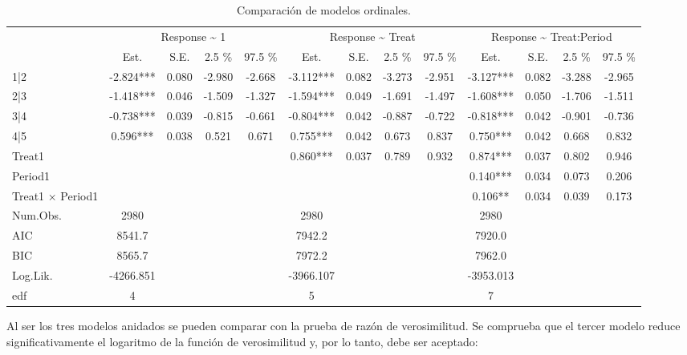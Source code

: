 \documentclass[
  12pt,
  a4paper,
  extrafontsizes,
  onecolumn,
  openright,
  table]{memoir}
\begin{document}
\hypertarget{tbl-ordinal-com}{}
\begin{longtable}{lcccccccccccc}
\caption{\label{tbl-ordinal-com}Comparación de modelos ordinales. }\tabularnewline

\toprule
 & \multicolumn{4}{c}{Response \textasciitilde{} 1    } & \multicolumn{4}{c}{Response \textasciitilde{} Treat    } & \multicolumn{4}{c}{Response \textasciitilde{} Treat:Period    } \\ 
\cmidrule(lr){2-5} \cmidrule(lr){6-9} \cmidrule(lr){10-13}
  & Est. & S.E. & 2.5 \% & 97.5 \% & Est.  & S.E.  & 2.5 \%  & 97.5 \%  & Est.   & S.E.   & 2.5 \%   & 97.5 \%   \\ 
\midrule
1|2  & -2.824*** & 0.080 & -2.980 & -2.668 & -3.112*** & 0.082 & -3.273 & -2.951 & -3.127*** & 0.082 & -3.288 & -2.965 \\ 
2|3  & -1.418*** & 0.046 & -1.509 & -1.327 & -1.594*** & 0.049 & -1.691 & -1.497 & -1.608*** & 0.050 & -1.706 & -1.511 \\ 
3|4  & -0.738*** & 0.039 & -0.815 & -0.661 & -0.804*** & 0.042 & -0.887 & -0.722 & -0.818*** & 0.042 & -0.901 & -0.736 \\ 
4|5  & 0.596*** & 0.038 & 0.521 & 0.671 & 0.755*** & 0.042 & 0.673 & 0.837 & 0.750*** & 0.042 & 0.668 & 0.832 \\ 
Treat1  &  &  &  &  & 0.860*** & 0.037 & 0.789 & 0.932 & 0.874*** & 0.037 & 0.802 & 0.946 \\ 
Period1  &  &  &  &  &  &  &  &  & 0.140*** & 0.034 & 0.073 & 0.206 \\ 
Treat1 × Period1  &  &  &  &  &  &  &  &  & 0.106** & 0.034 & 0.039 & 0.173 \\ 
Num.Obs. & 2980 &  &  &  & 2980 &  &  &  & 2980 &  &  &  \\ 
AIC & 8541.7 &  &  &  & 7942.2 &  &  &  & 7920.0 &  &  &  \\ 
BIC & 8565.7 &  &  &  & 7972.2 &  &  &  & 7962.0 &  &  &  \\ 
Log.Lik. & -4266.851 &  &  &  & -3966.107 &  &  &  & -3953.013 &  &  &  \\ 
edf & 4 &  &  &  & 5 &  &  &  & 7 &  &  &  \\ 
\bottomrule
\end{longtable}

\normalsize

Al ser los tres modelos anidados se pueden comparar con la prueba de
razón de verosimilitud. Se comprueba que el tercer modelo reduce
significativamente el logaritmo de la función de verosimilitud y, por lo
tanto, debe ser aceptado:
\end{document}
